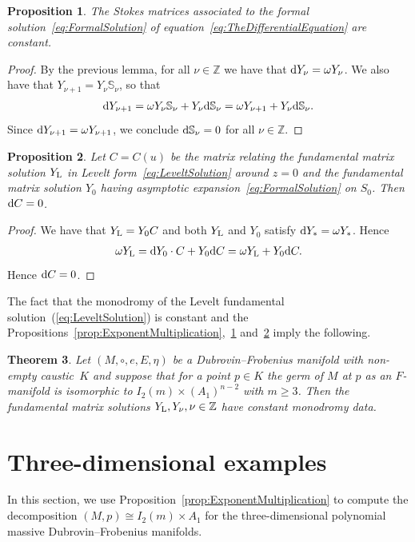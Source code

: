 \documentclass[pdftex]{sigma}
\numberwithin{equation}{section}
\newtheorem{Theorem}{Theorem}[section]
\newtheorem{Proposition}[Theorem]{Proposition}
 { \theoremstyle{definition}
\newtheorem{Definition}[Theorem]{Definition}
\newtheorem{Note}[Theorem]{Note}
\newtheorem{Example}[Theorem]{Example}
\newtheorem{Remark}[Theorem]{Remark} }
\begin{document}
\begin{Proposition}
 \label{prop:ConstantStokes}
 The Stokes matrices associated to the formal solution~\eqref{eq:FormalSolution} of equation~\eqref{eq:TheDifferentialEquation} are constant.
\end{Proposition}
\begin{proof}
 By the previous lemma, for all $\nu\in\mathbb{Z}$ we have that ${\rm d}Y_{\nu}=\omega Y_{\nu}$. We also have that $Y_{\nu+1}=Y_{\nu}\mathbb{S}_{\nu}$, so that
 \begin{align*}
 {\rm d}Y_{\nu+1} =\omega Y_{\nu}\mathbb{S}_{\nu}+Y_{\nu}{\rm d}\mathbb{S}_{\nu} =\omega Y_{\nu+1}+Y_{\nu}{\rm d}\mathbb{S}_{\nu}.
 \end{align*}
 Since ${\rm d}Y_{\nu+1}=\omega Y_{\nu+1}$, we conclude ${\rm d}\mathbb{S}_{\nu}=0$ for all $\nu\in\mathbb{Z}$.
\end{proof}
\begin{Proposition}
 \label{ConstantConnectionMatrix}
 Let $C=C(u)$ be the matrix relating the fundamental matrix solution $Y_{\rm L}$ in Levelt form~\eqref{eq:LeveltSolution} around $z=0$ and the fundamental matrix solution $Y_{0}$ having asymptotic expansion~\eqref{eq:FormalSolution} on $S_{0}$. Then ${\rm d}C=0$.
\end{Proposition}
\begin{proof}
 We have that $Y_{\rm L}=Y_{0}C$ and both $Y_{\rm L}$ and $Y_{0}$ satisfy ${\rm d}Y_{*}=\omega Y_{*}$. Hence
 \begin{align*}
 \omega Y_{\rm L} ={\rm d}Y_{0}\cdot C+Y_{0}{\rm d} C =\omega Y_{\rm L}+Y_{0}{\rm d}C.
 \end{align*}
 Hence ${\rm d}C=0$.
\end{proof}

The fact that the monodromy of the Levelt fundamental solution~(\ref{eq:LeveltSolution}) is constant and the Propositions~\ref{prop:ExponentMultiplication},~\ref{prop:ConstantStokes} and~\ref{ConstantConnectionMatrix} imply the following.
\begin{Theorem}
 \label{thm:Isomonodromy}
 Let $(M,\circ,e,E,\eta)$ be a Dubrovin--Frobenius manifold with non-empty caustic~$K$ and suppose that for a point $p\in K$ the germ of $M$ at $p$ as an $F$-manifold is isomorphic to $I_{2}(m)\times(A_{1})^{n-2}$ with $m\geq 3$. Then the fundamental matrix solutions $Y_{\rm L},Y_{\nu},\nu\in\mathbb{Z}$ have constant monodromy data.
 \end{Theorem}

 \section{Three-dimensional examples}
\label{sec:Examples}
In this section, we use Proposition~\ref{prop:ExponentMultiplication} to compute the decomposition $(M,p)\cong I_{2}(m)\times A_{1}$ for the three-dimensional polynomial massive Dubrovin--Frobenius manifolds.
\end{document}

